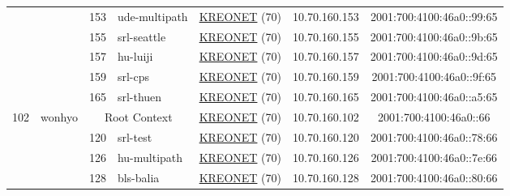 \begin{small}
\begin{center}
\begin{longtable}{|c|c|c|c|c|c|c|c|}
  &  & \tiny{153} & \multicolumn{1}{|l|}{\tiny{ude-multipath}} & \multicolumn{2}{|c|}{\tiny{\href{http://www.kreonet.net}{KREONET} (70)}} & \tiny{10.70.160.153} & \tiny{2001:700:4100:46a0::99:65} \\* \cline{3-3}\cline{4-4}\cline{5-5}\cline{6-6}\cline{7-7}\cline{8-8}
  &  & \tiny{155} & \multicolumn{1}{|l|}{\tiny{srl-seattle}} & \multicolumn{2}{|c|}{\tiny{\href{http://www.kreonet.net}{KREONET} (70)}} & \tiny{10.70.160.155} & \tiny{2001:700:4100:46a0::9b:65} \\* \cline{3-3}\cline{4-4}\cline{5-5}\cline{6-6}\cline{7-7}\cline{8-8}
  &  & \tiny{157} & \multicolumn{1}{|l|}{\tiny{hu-luiji}} & \multicolumn{2}{|c|}{\tiny{\href{http://www.kreonet.net}{KREONET} (70)}} & \tiny{10.70.160.157} & \tiny{2001:700:4100:46a0::9d:65} \\* \cline{3-3}\cline{4-4}\cline{5-5}\cline{6-6}\cline{7-7}\cline{8-8}
  &  & \tiny{159} & \multicolumn{1}{|l|}{\tiny{srl-cps}} & \multicolumn{2}{|c|}{\tiny{\href{http://www.kreonet.net}{KREONET} (70)}} & \tiny{10.70.160.159} & \tiny{2001:700:4100:46a0::9f:65} \\* \cline{3-3}\cline{4-4}\cline{5-5}\cline{6-6}\cline{7-7}\cline{8-8}
  &  & \tiny{165} & \multicolumn{1}{|l|}{\tiny{srl-thuen}} & \multicolumn{2}{|c|}{\tiny{\href{http://www.kreonet.net}{KREONET} (70)}} & \tiny{10.70.160.165} & \tiny{2001:700:4100:46a0::a5:65} \\ \hline
 \multirow{13}{*}{\tiny{102}} & \multicolumn{1}{|l|}{\multirow{13}{*}{\tiny{wonhyo}}} & \multicolumn{2}{|c|}{\tiny{Root Context}} & \multicolumn{2}{|c|}{\tiny{\href{http://www.kreonet.net}{KREONET} (70)}} & \tiny{10.70.160.102} & \tiny{2001:700:4100:46a0::66} \\* \cline{3-3}\cline{4-4}\cline{5-5}\cline{6-6}\cline{7-7}\cline{8-8}
  &  & \tiny{120} & \multicolumn{1}{|l|}{\tiny{srl-test}} & \multicolumn{2}{|c|}{\tiny{\href{http://www.kreonet.net}{KREONET} (70)}} & \tiny{10.70.160.120} & \tiny{2001:700:4100:46a0::78:66} \\* \cline{3-3}\cline{4-4}\cline{5-5}\cline{6-6}\cline{7-7}\cline{8-8}
  &  & \tiny{126} & \multicolumn{1}{|l|}{\tiny{hu-multipath}} & \multicolumn{2}{|c|}{\tiny{\href{http://www.kreonet.net}{KREONET} (70)}} & \tiny{10.70.160.126} & \tiny{2001:700:4100:46a0::7e:66} \\* \cline{3-3}\cline{4-4}\cline{5-5}\cline{6-6}\cline{7-7}\cline{8-8}
  &  & \tiny{128} & \multicolumn{1}{|l|}{\tiny{bls-balia}} & \multicolumn{2}{|c|}{\tiny{\href{http://www.kreonet.net}{KREONET} (70)}} & \tiny{10.70.160.128} & \tiny{2001:700:4100:46a0::80:66} \\* \cline{3-3}\cline{4-4}\cline{5-5}\cline{6-6}\cline{7-7}\cline{8-8}

\end{longtable}
\end{center}
\end{small}

